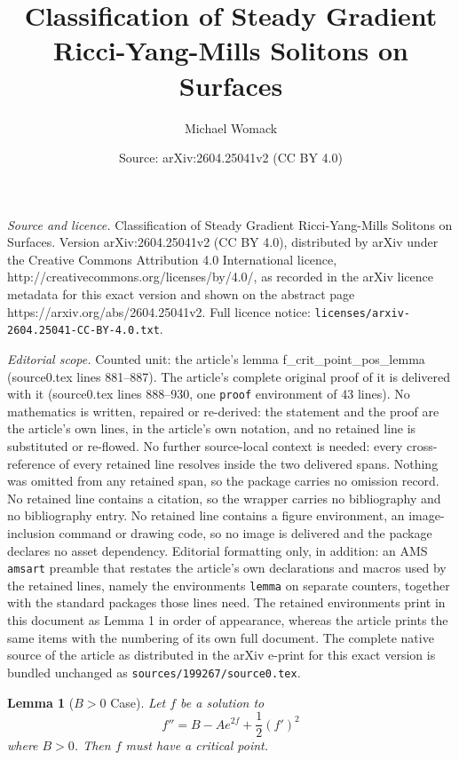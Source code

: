 \documentclass[10pt,a4paper]{amsart}
\title{Classification of Steady Gradient Ricci-Yang-Mills Solitons on Surfaces}
\author{Michael Womack}
\date{Source: arXiv:2604.25041v2 (CC BY 4.0)}
\newtheorem{lemma}{Lemma}
\begin{document}
\maketitle

\noindent\emph{Source and licence.} Classification of Steady Gradient Ricci-Yang-Mills Solitons on Surfaces. Version arXiv:2604.25041v2 (CC BY 4.0), distributed by arXiv under the Creative Commons Attribution 4.0 International licence, http://creativecommons.org/licenses/by/4.0/, as recorded in the arXiv licence metadata for this exact version and shown on the abstract page https://arxiv.org/abs/2604.25041v2. Full licence notice: \texttt{licenses/arxiv-2604.25041-CC-BY-4.0.txt}.\par\smallskip

\noindent\textit{Editorial scope.} Counted unit: the article's lemma f\_crit\_point\_pos\_lemma (source0.tex lines 881--887). The article's complete original proof of it is delivered with it (source0.tex lines 888--930, one \texttt{proof} environment of 43 lines). No mathematics is written, repaired or re-derived: the statement and the proof are the article's own lines, in the article's own notation, and no retained line is substituted or re-flowed.  No further source-local context is needed: every cross-reference of every retained line resolves inside the two delivered spans.  Nothing was omitted from any retained span, so the package carries no omission record.  No retained line contains a citation, so the wrapper carries no bibliography and no bibliography entry.  No retained line contains a figure environment, an image-inclusion command or drawing code, so no image is delivered and the package declares no asset dependency.  Editorial formatting only, in addition: an AMS \texttt{amsart} preamble that restates the article's own declarations and macros used by the retained lines, namely the environments \texttt{lemma} on separate counters, together with the standard packages those lines need.  The retained environments print in this document as Lemma 1 in order of appearance, whereas the article prints the same items with the numbering of its own full document.  The complete native source of the article as distributed in the arXiv e-print for this exact version is bundled unchanged as \texttt{sources/199267/source0.tex}.
\begin{lemma}[$B>0$ Case]\label{f_crit_point_pos_lemma}
  Let $f$ be a solution to
  \[
    f'' = B-Ae^{2f}+\frac{1}{2}(f')^{2}
  \]
  where $B>0$. Then $f$ must have a critical point.
\end{lemma}
\end{document}
